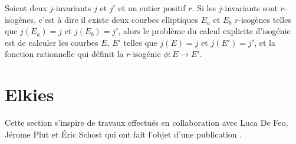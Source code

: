 \documentclass[10pt,a4paper]{book}
\theoremstyle{plain}
\theoremstyle{definition}
\theoremstyle{definition}
\theoremstyle{definition}
\theoremstyle{definition}
\theoremstyle{remark}
\theoremstyle{remark}
\theoremstyle{definition}
\begin{document}
Soient deux $j$-invariants $j$ et $j'$ et un entier positif $r$. Si les $j$-invariants sont $r$-isogènes, c'est à dire il existe deux courbes elliptiques $E_a$ et $E_b$ $r$-isogènes telles que $j(E_a)=j$ et $j(E_b)=j'$, alors le problème du calcul explicite d'isogénie est de calculer les courbes $E$, $E'$ telles que $j(E)=j$ et $j(E')=j'$, et la fonction rationnelle qui définit la $r$-isogénie $\phi:E \rightarrow E'$.

\section{Elkies}
\label{sec:cou:elk}
Cette section s'inspire de travaux effectués en collaboration avec Luca De Feo, J\'erome Plut et \'Eric Schost qui ont fait l'objet d'une publication \cite{Defeo_Plut_Schost_2016}.
\end{document}
